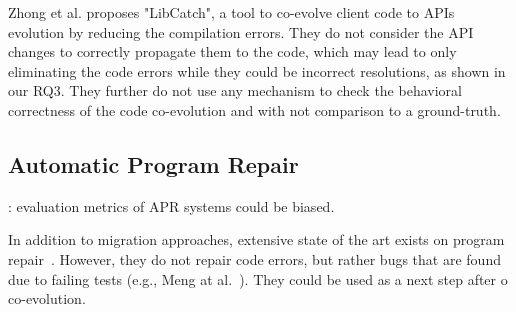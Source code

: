  
 Zhong et al. \cite{10.1145/3597503.3639084} proposes "LibCatch", a tool to co-evolve client code to APIs evolution by reducing the compilation errors. They do not consider the API changes to correctly propagate them to the code, which may lead to only eliminating the code errors while they could be incorrect resolutions, as shown in our RQ3. They further do not use any mechanism to check the behavioral correctness of the code co-evolution and with not comparison to a ground-truth.
 
 
 
 
 
 
 
 \subsection{Automatic Program Repair}
 \label{APR}
 \cite{LIU2021110817} : evaluation metrics of APR systems could be biased. 
 
 In addition to migration approaches, extensive state of the art exists on program repair~\cite{goues2019automated,liu2020efficiency,monperrus2018automatic,gazzola2017automatic}. However, they do not repair code errors, but rather bugs that are found due to failing tests (e.g., Meng at al.~\cite{10.5555/2486788.2486855}). 
 They could be used as a next step after o co-evolution. 
 
